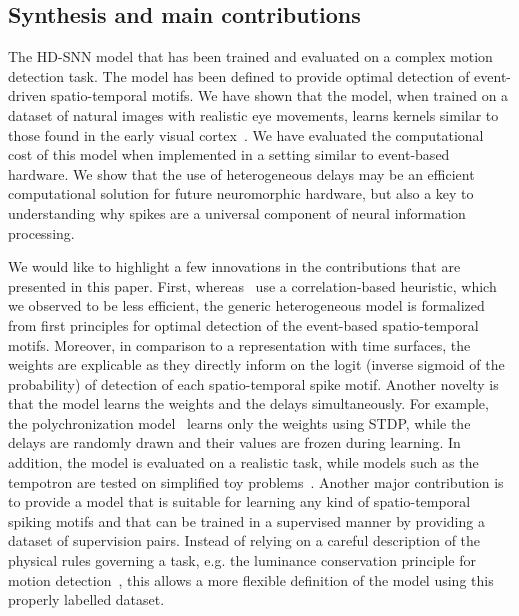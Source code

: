 \documentclass[default]{sn-jnl}%
\theoremstyle{thmstyleone}%
\theoremstyle{thmstyletwo}%
\theoremstyle{thmstylethree}%
\begin{document}
\subsection{Synthesis and main contributions}
The HD-SNN model that has been trained and evaluated on a complex motion detection task. The model has been defined to provide optimal detection of event-driven spatio-temporal motifs. We have shown that the model, when trained on a dataset of natural images with realistic eye movements, learns kernels similar to those found in the early visual cortex~\cite{kremkow_push-pull_2016}. %
We have evaluated the computational cost of this model when implemented in a setting similar to event-based hardware. We show that the use of heterogeneous delays may be an efficient computational solution for future neuromorphic hardware, but also a key to understanding why spikes are a universal component of neural information processing.

We would like to highlight a few innovations in the contributions that are presented in this paper. First, whereas~\citep{ghosh_spatiotemporal_2019,yu_stsc-snn_2022} use a correlation-based heuristic, which we observed to be less efficient, the generic heterogeneous model is formalized from first principles for optimal detection of the event-based spatio-temporal motifs. Moreover, in comparison to a representation with time surfaces, the weights are explicable as they directly inform on the logit (inverse sigmoid of the probability) of detection of each spatio-temporal spike motif. Another novelty is that the model learns the weights and the delays simultaneously. For example, the polychronization model~\citep{izhikevich_polychronization_2006} learns only the weights using STDP, while the delays are randomly drawn and their values are frozen during learning. In addition, the model is evaluated on a realistic task, while models such as the tempotron are tested on simplified toy problems~\citep{gutig_tempotron_2006}. Another major contribution is to provide a model that is suitable for learning any kind of spatio-temporal spiking motifs and that can be trained in a supervised manner by providing a dataset of supervision pairs. Instead of relying on a careful description of the physical rules governing a task, e.g. the luminance conservation principle for motion detection~\citep{benosman_asynchronous_2012, dardelet_event-by-event_2021}, this allows a more flexible definition of the model using this properly labelled dataset.
%
\end{document}

